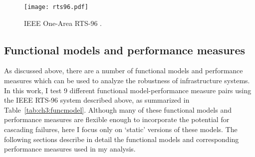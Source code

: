 \begin{figure}[!htp]
\centerline{\texttt{[image: rts96.pdf]}}
\caption[IEEE One-Area RTS-96]{\label{fig:ch3:rts96}IEEE One-Area RTS-96 \cite{Grigg1999}.}
\end{figure}



\subsection{Functional models and performance measures}
\label{sec:ch3:methods:models}

As discussed above, there are a number of functional models and performance measures which can be used to analyze the robustness of infrastructure systems.  In this work, I test 9 different functional model-performance measure pairs using the IEEE RTS-96 system described above, as summarized in Table~\ref{tab:ch3:funcmodel}.  Although many of these functional models and performance measures are flexible enough to incorporate the potential for cascading failures, here I focus only on `static' versions of these models. The following sections describe in detail the functional models and corresponding performance measures used in my analysis.


